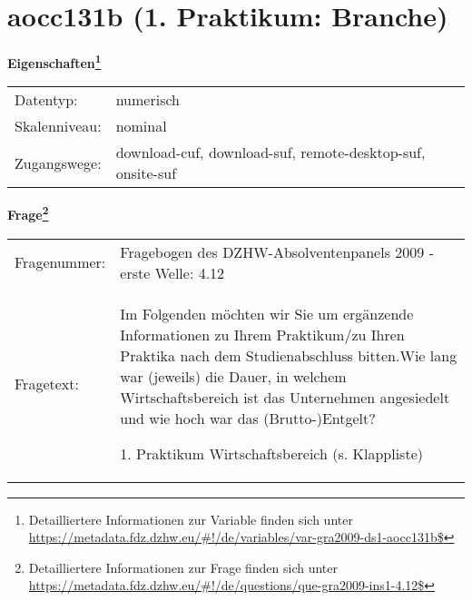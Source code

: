 
    \setcounter{footnote}{0}

    \vspace*{-1.8cm}
	\section{aocc131b (1. Praktikum: Branche)}
	\label{section:aocc131b}



    \vspace*{0.5cm}
    \noindent\textbf{Eigenschaften\footnote{Detailliertere Informationen zur Variable finden sich unter
		\url{https://metadata.fdz.dzhw.eu/\#!/de/variables/var-gra2009-ds1-aocc131b$}}}\\
	\begin{tabularx}{\hsize}{@{}lX}
	Datentyp: & numerisch \\
	Skalenniveau: & nominal \\
	Zugangswege: &
	  download-cuf, 
	  download-suf, 
	  remote-desktop-suf, 
	  onsite-suf
 \\
    \end{tabularx}



				\vspace*{0.5cm}
                \noindent\textbf{Frage\footnote{Detailliertere Informationen zur Frage finden sich unter
		              \url{https://metadata.fdz.dzhw.eu/\#!/de/questions/que-gra2009-ins1-4.12$}}}\\
				\begin{tabularx}{\hsize}{@{}lX}
					Fragenummer: &
					  Fragebogen des DZHW-Absolventenpanels 2009 - erste Welle:
					  4.12
 \\
					Fragetext: & Im Folgenden möchten wir Sie um ergänzende Informationen zu Ihrem Praktikum/zu Ihren Praktika nach dem Studienabschluss bitten.Wie lang war (jeweils) die Dauer, in welchem Wirtschaftsbereich ist das Unternehmen angesiedelt und wie hoch war das (Brutto-)Entgelt?\par  1. Praktikum Wirtschaftsbereich (s. Klappliste) \\
				\end{tabularx}





